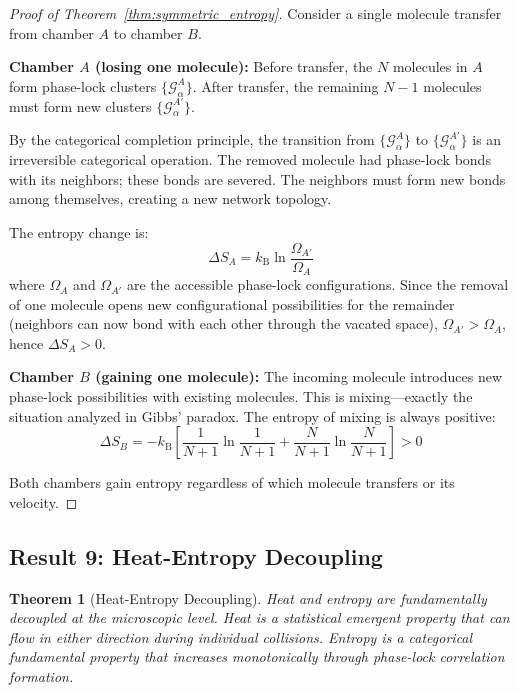 \documentclass[twocolumn,showpacs,preprintnumbers,amsmath,amssymb,prd]{revtex4-2}
\newtheorem{theorem}{Theorem}[section]
\theoremstyle{definition}
\theoremstyle{remark}
\newcommand{\kB}{k_{\mathrm{B}}}
\newcommand{\phaselockgraph}{\mathcal{G}}
\begin{document}
\begin{proof}[Proof of Theorem~\ref{thm:symmetric_entropy}]
Consider a single molecule transfer from chamber $A$ to chamber $B$.

\textbf{Chamber $A$ (losing one molecule):}
Before transfer, the $N$ molecules in $A$ form phase-lock clusters $\{\phaselockgraph_\alpha^A\}$. After transfer, the remaining $N-1$ molecules must form new clusters $\{\phaselockgraph_\alpha^{A'}\}$.

By the categorical completion principle, the transition from $\{\phaselockgraph_\alpha^A\}$ to $\{\phaselockgraph_\alpha^{A'}\}$ is an irreversible categorical operation. The removed molecule had phase-lock bonds with its neighbors; these bonds are severed. The neighbors must form new bonds among themselves, creating a new network topology.

The entropy change is:
\begin{equation}
\Delta S_A = \kB \ln \frac{\Omega_{A'}}{\Omega_A}
\end{equation}
where $\Omega_A$ and $\Omega_{A'}$ are the accessible phase-lock configurations. Since the removal of one molecule opens new configurational possibilities for the remainder (neighbors can now bond with each other through the vacated space), $\Omega_{A'} > \Omega_A$, hence $\Delta S_A > 0$.

\textbf{Chamber $B$ (gaining one molecule):}
The incoming molecule introduces new phase-lock possibilities with existing molecules. This is mixing---exactly the situation analyzed in Gibbs' paradox. The entropy of mixing is always positive:
\begin{equation}
\Delta S_B = -\kB \left[\frac{1}{N+1}\ln\frac{1}{N+1} + \frac{N}{N+1}\ln\frac{N}{N+1}\right] > 0
\end{equation}

Both chambers gain entropy regardless of which molecule transfers or its velocity.
\end{proof}

\subsection{Result 9: Heat-Entropy Decoupling}

\begin{theorem}[Heat-Entropy Decoupling]
\label{thm:heat_entropy_decoupling}
Heat and entropy are fundamentally decoupled at the microscopic level. Heat is a statistical emergent property that can flow in either direction during individual collisions. Entropy is a categorical fundamental property that increases monotonically through phase-lock correlation formation.
\end{theorem}
\end{document}
